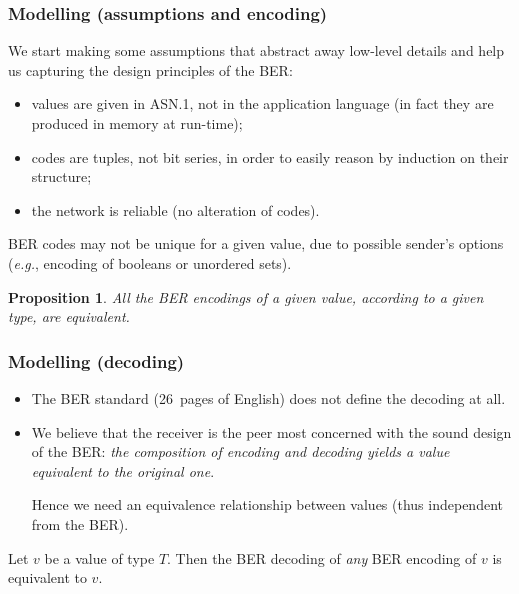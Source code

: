 \documentclass[compress,dvips,xcolor={dvipsnames},t]{beamer}
\newtheorem{proposition}{Proposition}
\newcommand\ASN{\textsf{ASN.1}\xspace}
\begin{document}
\begin{frame}
\frametitle{Modelling (assumptions and encoding)}

We start making some assumptions that abstract away low-level details
and help us capturing the design principles of the BER:
\begin{itemize}

  \item values are given in \ASN, not in the application language (in
  fact they are produced in memory at run-time);

  \item codes are tuples, not bit series, in order to easily reason by
  induction on their structure;

  \item the network is reliable (no alteration of codes).

\end{itemize}
BER codes may not be unique for a given value, due to possible
sender's options (\emph{e.g.}, encoding of booleans or unordered
sets).
\begin{proposition}
All the BER encodings of a given value, according to a given type, are
equivalent.
\end{proposition}

\end{frame}

\begin{frame}
\frametitle{Modelling (decoding)}

\begin{itemize}

  \item The BER standard (26~pages of English) does not define the
  decoding at all.

  \item We believe that the receiver is the peer most concerned with
  the sound design of the BER: \emph{the composition of encoding and
  decoding yields a value equivalent to the original one}.

  Hence we need an equivalence relationship between values
  (thus independent from the BER).

\end{itemize}

  \begin{theorem}[Soundness]
    Let $v$ be a value of type $T$. Then the BER decoding of
    \emph{any} BER encoding of $v$ is equivalent to $v$.
  \end{theorem}

\end{frame}
\end{document}
